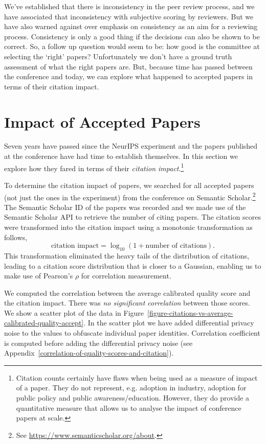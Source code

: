 \documentclass[twoside]{article}
\begin{document}
We've established that there is inconsistency in the peer review
process, and we have associated that inconsistency with subjective
scoring by reviewers. But we have also warned against over emphasis on
consistency as an aim for a reviewing process. Consistency is only a
good thing if the decisions can also be shown to be correct. So, a
follow up question would seem to be: how good is the committee at
selecting the `right' papers? Unfortunately we don't have a ground
truth assessment of what the right papers are. But, because time has
passed between the conference and today, we can explore what happened
to accepted papers in terms of their citation impact.

\section{Impact of Accepted Papers}

Seven years have passed since the NeurIPS experiment and the papers
published at the conference have had time to establish themselves. In
this section we explore how they fared in terms of their
\emph{citation impact}.\footnote{Citation counts certainly have flaws
  when being used as a measure of impact of a paper. They do not
  represent, e.g. adoption in industry, adoption for public policy and
  public awareness/education. However, they do provide a quantitative
  measure that allows us to analyse the impact of conference papers at
  scale.}

To determine the citation impact of papers, we searched for all
accepted papers (not just the ones in the experiment) from the conference on Semantic Scholar.\footnote{See
  \url{https://www.semanticscholar.org/about}.}
The Semantic Scholar ID of the papers was recorded and we made use of
the Semantic Scholar API to retrieve the number of citing papers. The
citation scores were transformed into the citation impact using a
monotonic transformation as follows,
$$
\text{citation impact} = \log_{10} (1 + \text{number of citations}).
$$
This transformation eliminated the heavy tails of the distribution
of citations, leading to a citation score distribution that is closer
to a Gaussian, enabling us to make use of Pearson's $\rho$ for
correlation measurement.

We computed the correlation between the average calibrated quality
score and the citation impact. There was \emph{no significant
  correlation} between those scores. We show a scatter plot of the
data in Figure~\ref{figure-citations-vs-average-calibrated-quality-accept}. In the
scatter plot we have added differential privacy noise to the values
 to obfuscate individual paper
identities. Correlation coefficient is computed before adding the
differential privacy noise (see Appendix~\ref{correlation-of-quality-scores-and-citation}).
\end{document}
